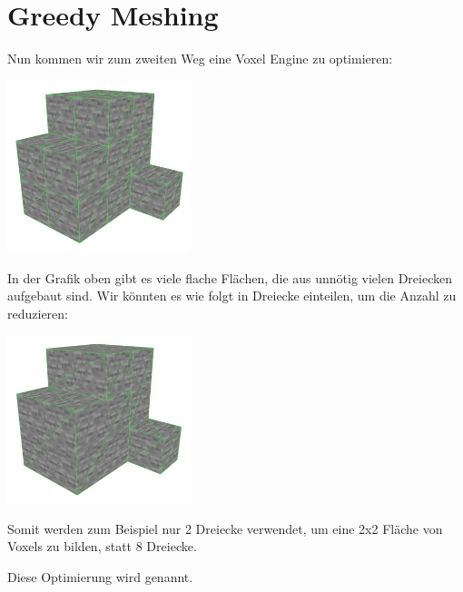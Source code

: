 \section{Greedy Meshing}

Nun kommen wir zum zweiten Weg eine Voxel Engine
zu optimieren:

\begin{center}
\includegraphics[width=0.4\textwidth]{../assets/greedy/stone_simple.png}
\end{center}

In der Grafik oben gibt es viele flache Flächen,
die aus unnötig vielen Dreiecken aufgebaut sind.
Wir könnten es wie folgt in Dreiecke einteilen,
um die Anzahl zu reduzieren:

\begin{center}
\includegraphics[width=0.4\textwidth]{../assets/greedy/stone_greedy.png}
\end{center}

Somit werden zum Beispiel nur 2 Dreiecke verwendet,
um eine 2x2 Fläche von Voxels zu bilden,
statt 8 Dreiecke.

Diese Optimierung wird  genannt.

{  }

\pagebreak

{  }
